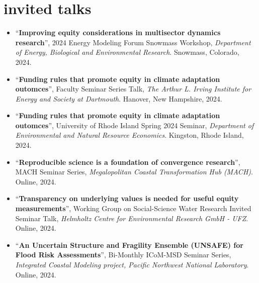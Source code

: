 \documentclass[10pt,oneside]{article}
\begin{document}
\mbox{}\vspace{-\dimexpr\baselineskip\relax}
\vspace*{-1em}
\printbibliography[type=misc, heading=none]


\section{invited talks}

\mbox{}\vspace{-\dimexpr\baselineskip\relax}

\begin{itemize}[label={}]
  
  \item \enquote{\textbf{Improving equity considerations in multisector dynamics research}}, 2024 Energy Modeling Forum Snowmass Workshop,  \textit{Department of Energy, Biological and Environmental Research}. Snowmass, Colorado, 2024.
  
  \item \enquote{\textbf{Funding rules that promote equity in climate adaptation outomces}}, Faculty Seminar Series Talk,  \textit{The Arthur L. Irving Institute for Energy and Society at Dartmouth}. Hanover, New Hampshire, 2024.
  
  \item \enquote{\textbf{Funding rules that promote equity in climate adaptation outomces}}, University of Rhode Island Spring 2024 Seminar,  \textit{Department of Environmental and Natural Resource Economics}. Kingston, Rhode Island, 2024.
  
  \item \enquote{\textbf{Reproducible science is a foundation of convergence research}}, MACH Seminar Series,  \textit{Megalopolitan Coastal Transformation Hub (MACH)}. Online, 2024.
  
  \item \enquote{\textbf{Transparency on underlying values is needed for useful equity measurements}}, Working Group on Social-Science Water Research Invited Seminar Talk,  \textit{Helmholtz Centre for Environmental Research GmbH - UFZ}. Online, 2024.
  
  \item \enquote{\textbf{An Uncertain Structure and Fragility Ensemble (UNSAFE) for Flood Risk Assessments}}, Bi-Monthly ICoM-MSD Seminar Series,  \textit{Integrated Coastal Modeling project, Pacific Northwest National Laboratory}. Online, 2024.
  

\end{itemize}
\end{document}
